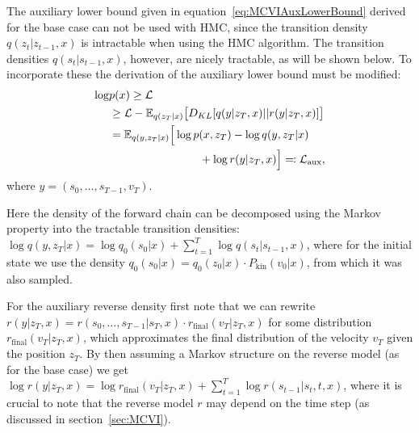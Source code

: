 The auxiliary lower bound given in equation~\eqref{eq:MCVIAuxLowerBound} derived for the base case can not be used with HMC, since the transition density $q(z_t|z_{t-1}, x)$ is intractable when using the HMC algorithm. The transition densities $q(s_t|s_{t-1}, x)$, however, are nicely tractable, as will be shown below. To incorporate these the derivation of the auxiliary lower bound must be modified:\begin{equation}
\begin{split}
\log & p(x) \geq \mathcal{L} \\
& \geq \mathcal{L} - \mathbb{E}_{q(z_T|x)} \big[ D_{KL}[q(y | z_T, x) || r(y | z_T, x)] \big] \\
& = \mathbb{E}_{q(y, z_T|x)} \Big[ \log p(x, z_T) - \log q(y, z_T|x) \\
& 	\qquad\qquad\qquad\qquad 							+ \log r(y | z_T, x) \Big] \eqqcolon \mathcal{L}_{\textrm{aux}},
\end{split}
\end{equation}
where $y = (s_0, \dots, s_{T-1}, v_T)$.

Here the density of the forward chain can be decomposed using the Markov property into the tractable transition densities:
$\log q(y, z_T|x) = \log q_0(s_0|x) + \sum_{t=1}^T \log q(s_t|s_{t-1}, x)$, where for the initial state we use the density $q_0(s_0|x) = q_0(z_0|x) \cdot P_\textrm{kin}(v_0|x)$, from which it was also sampled.

For the auxiliary reverse density first note that we can rewrite $r(y | z_T, x) = r(s_0, \ldots, s_{T-1}| s_T, x) \cdot r_{\textrm{final}}(v_T | z_T, x)$ for some distribution $r_{\textrm{final}}(v_T|z_T, x)$, which approximates the final distribution of the velocity $v_T$ given the position $z_T$. By then assuming a Markov structure on the reverse model (as for the base case) we get
$\log r(y | z_T, x) = \log r_{\textrm{final}}(v_T | z_T, x) + \sum_{t=1}^T \log r(s_{t-1}|s_t, t, x)$,
where it is crucial to note that the reverse model $r$ may depend on the time step (as discussed in section~\ref{sec:MCVI}).

